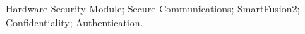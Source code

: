 \noindent Hardware Security Module; Secure Communications; SmartFusion2; Confidentiality; Authentication.

